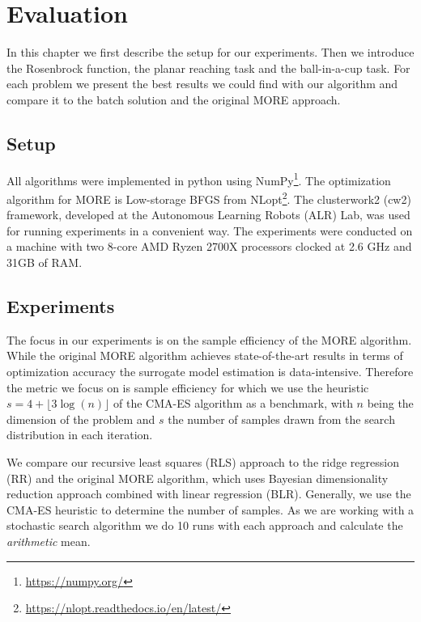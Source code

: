 
\chapter{Evaluation}
In this chapter we first describe the setup for our experiments.
Then we introduce the Rosenbrock function, the planar
reaching task and the ball-in-a-cup task. For each problem
we present the best results
we could find with our algorithm and compare it to the batch solution
and the original MORE approach.


\section{Setup}
All algorithms were implemented in python using
NumPy\footnote{\href{https://numpy.org/}{https://numpy.org/}}.
The optimization algorithm for MORE is Low-storage BFGS
from NLopt\footnote{\href{https://nlopt.readthedocs.io/en/latest/}
{https://nlopt.readthedocs.io/en/latest/}}.
The clusterwork2 (cw2) framework, developed at the
Autonomous Learning Robots (ALR) Lab, was used for
running experiments in a convenient way.
The experiments were conducted on a machine with two 8-core
AMD Ryzen 2700X processors clocked at 2.6 GHz and 31GB of RAM.


\section{Experiments}
The focus in our experiments is on the sample efficiency of the
MORE algorithm. While the original MORE algorithm achieves
state-of-the-art results in terms of optimization accuracy
the surrogate model estimation is data-intensive.
Therefore the metric we focus on is sample efficiency for which we
use the heuristic
$s = 4 + \lfloor 3 \log(n) \rfloor$ of the CMA-ES
algorithm \citep{hansen2016cma} as a benchmark, with $n$ being the dimension
of the problem and $s$ the number of samples drawn from the
search distribution in each iteration.

We compare our recursive least squares (RLS) approach
to the ridge regression (RR) and
the original MORE algorithm, which uses Bayesian dimensionality
reduction approach combined with linear regression (BLR).
Generally, we use the
CMA-ES heuristic to determine the number of samples.
As we are working with a stochastic search algorithm we do
10 runs with each approach and calculate the \textit{arithmetic} mean.

